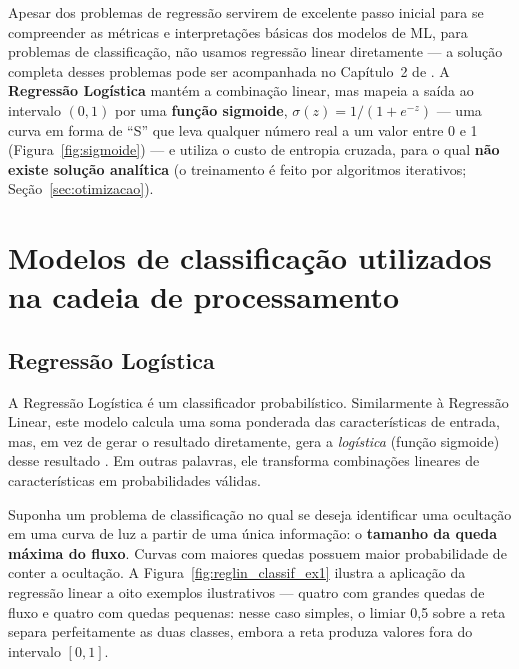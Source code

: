 Apesar dos problemas de regressão servirem de excelente passo inicial para se compreender as métricas e interpretações básicas dos modelos de ML, para problemas de classificação, não usamos regressão linear diretamente --- a solução completa desses problemas pode ser acompanhada no Capítulo~2 de \citet{Levada2026}. A \textbf{Regressão Logística} mantém a combinação linear, mas mapeia a saída ao intervalo $(0,1)$ por uma \textbf{função sigmoide}, $\sigma(z)=1/(1+e^{-z})$ --- uma curva em forma de ``S'' que leva qualquer número real a um valor entre 0 e 1 (Figura~\ref{fig:sigmoide}) --- e utiliza o custo de entropia cruzada, para o qual \textbf{não existe solução analítica} (o treinamento é feito por algoritmos iterativos; Seção~\ref{sec:otimizacao}).

\let\oldsectionmark\sectionmark %
\renewcommand{\sectionmark}[1]{\oldsectionmark{Modelos de classificação utilizados}}
\section{Modelos de classificação utilizados na cadeia de processamento}
\let\sectionmark\oldsectionmark
\label{sec:modelos_classificacao}

\subsection{Regressão Logística}

A Regressão Logística é um classificador probabilístico. Similarmente à Regressão Linear, este modelo calcula uma soma ponderada das características de entrada, mas, em vez de gerar o resultado diretamente, gera a \textit{logística} (função sigmoide) desse resultado \citep{geron2019maos}. Em outras palavras, ele transforma combinações lineares de características em probabilidades válidas.

Suponha um problema de classificação no qual se deseja identificar uma ocultação em uma curva de luz a partir de uma única informação: o \textbf{tamanho da queda máxima do fluxo}. Curvas com maiores quedas possuem maior probabilidade de conter a ocultação. A Figura~\ref{fig:reglin_classif_ex1} ilustra a aplicação da regressão linear a oito exemplos ilustrativos --- quatro com grandes quedas de fluxo e quatro com quedas pequenas: nesse caso simples, o limiar 0,5 sobre a reta separa perfeitamente as duas classes, embora a reta produza valores fora do intervalo $[0,1]$.

